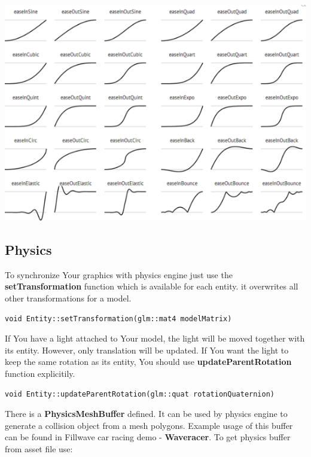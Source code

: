 \documentclass{article}
\begin{document}
\begin{center}

\includegraphics[scale=0.6]{easing.png}

\end{center}

\subsection{Physics}\label{sec:Physics}
\indent \indent To synchronize Your graphics with physics engine just use the \textbf{setTransformation} function which is available for each entity. it overwrites all other transformations for a model.

\begin{lstlisting}
void Entity::setTransformation(glm::mat4 modelMatrix)
\end{lstlisting}

\indent \indent If You have a light attached to Your model, the light will be moved together with its entity. However, only translation will be updated. If You want the light to keep the same rotation as its entity, You should use \textbf{updateParentRotation} function explicitily. 

\begin{lstlisting}
void Entity::updateParentRotation(glm::quat rotationQuaternion)
\end{lstlisting}

\indent \indent There is a \textbf{PhysicsMeshBuffer} defined. It can be used by physics engine to generate a collision object from a mesh polygons. Example usage of this buffer can be found in Fillwave car racing demo - \textbf{Waveracer}. To get physics buffer from asset file use:
\end{document}

